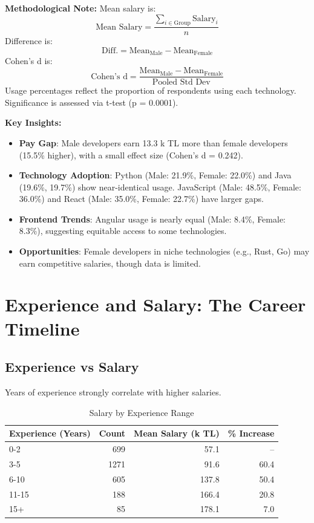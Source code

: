\documentclass[12pt,a4paper]{article}
\begin{document}
\textbf{Methodological Note:}
Mean salary is:
\[
	\text{Mean Salary} = \frac{\sum_{i \in \text{Group}} \text{Salary}_i}{n}
\]
Difference is:
\[
	\text{Diff.} = \text{Mean}_{\text{Male}} - \text{Mean}_{\text{Female}}
\]
Cohen's d is:
\[
	\text{Cohen's d} = \frac{\text{Mean}_{\text{Male}} - \text{Mean}_{\text{Female}}}{\text{Pooled Std Dev}}
\]
Usage percentages reflect the proportion of respondents using each technology. Significance is assessed via t-test (p = 0.0001).

\textbf{Key Insights:}
\begin{itemize}
	\item \textbf{Pay Gap}: Male developers earn 13.3 k TL more than female developers (15.5\% higher), with a small effect size (Cohen's d = 0.242).
	\item \textbf{Technology Adoption}: Python (Male: 21.9\%, Female: 22.0\%) and Java (19.6\%, 19.7\%) show near-identical usage. JavaScript (Male: 48.5\%, Female: 36.0\%) and React (Male: 35.0\%, Female: 22.7\%) have larger gaps.
	\item \textbf{Frontend Trends}: Angular usage is nearly equal (Male: 8.4\%, Female: 8.3\%), suggesting equitable access to some technologies.
	\item \textbf{Opportunities}: Female developers in niche technologies (e.g., Rust, Go) may earn competitive salaries, though data is limited.
\end{itemize}

\section{Experience and Salary: The Career Timeline}

\subsection{Experience vs Salary}
Years of experience strongly correlate with higher salaries.

\begin{table}[H]
	\centering
	\small
	\begin{tabular}{lrrr}
		\toprule
		\textbf{Experience (Years)} & \textbf{Count} & \textbf{Mean Salary (k TL)} & \textbf{\% Increase} \\
		\midrule
		0-2                         & 699            & 57.1                        & --                   \\
		3-5                         & 1271           & 91.6                        & 60.4                 \\
		6-10                        & 605            & 137.8                       & 50.4                 \\
		11-15                       & 188            & 166.4                       & 20.8                 \\
		15+                         & 85             & 178.1                       & 7.0                  \\
		\bottomrule
	\end{tabular}
	\caption{Salary by Experience Range}
\end{table}
\end{document}
